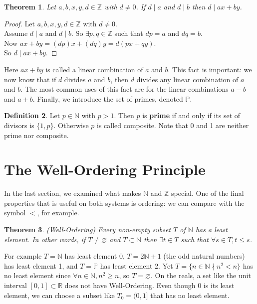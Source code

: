 \documentclass[11pt]{amsart}
\newtheorem{theorem}{Theorem}[section]
\theoremstyle{definition}
\newtheorem{definition}[theorem]{Definition}
\newcommand{\reals}{\mathbb{R}}
\newcommand{\integers}{\mathbb{Z}}
\newcommand{\naturals}{\mathbb{N}}
\newcommand{\primes}{\mathbb{P}}
\let\emptyset\varnothing
\begin{document}
\begin{theorem}
	Let $a, b, x, y, d \in \integers$ with $d \neq 0$. If $d \mid a$ and $d \mid b$ then $d \mid ax + by$.
\end{theorem}
\begin{proof}
	Let $a, b, x, y, d \in \integers$ with $d \neq 0$. \\
	Assume $d \mid a$ and $d \mid b$. So $\exists p, q \in \integers$ such that $dp = a$ and $dq = b$. \\
	Now $ax + by = (dp)x + (dq)y = d(px + qy)$. \\
	So $d \mid ax + by$.
\end{proof}
Here $ax + by$ is called a linear combination of $a$ and $b$. This fact is important: we now know that if $d$ divides $a$ and $b$, then $d$
divides any linear combination of $a$ and $b$. The most common uses of this fact are for the linear combinations $a - b$ and $a + b$.
Finally, we introduce the set of primes, denoted $\primes$.
\begin{definition}
	Let $p \in \naturals$ with $p > 1$. Then $p$ is \textbf{prime} if and only if its set of divisors is $\{ 1, p \}$. Otherwise $p$ is called composite.
	Note that 0 and 1 are neither prime nor composite.
\end{definition}

\newpage
\section{The Well-Ordering Principle}
In the last section, we examined what makes $\naturals$ and $\integers$ special. One of the final properties that is useful on both systems is
ordering: we can compare with the symbol $<$, for example.
\begin{theorem}(Well-Ordering)
	Every non-empty subset $T$ of $\naturals$ has a least element. In other words, if $T \neq \emptyset$ and $T \subset \naturals$ then
	$\exists t \in T$ such that $\forall s \in T, t \leq s$.
\end{theorem}
For example $T = \naturals$ has least element 0, $T = 2\naturals + 1$ (the odd natural numbers) has least element 1, and $T = \primes$ has
least element $2$. Yet $T = \{ n \in \naturals \nmid n^2 < n \}$ has no least element since $\forall n \in \naturals, n^2 \geq n$, so $T = \emptyset$.
On the reals, a set like the unit interval $[ 0, 1 ] \subset \reals$ does not have Well-Ordering. Even though 0 is its least element, we can choose
a subset like $T_0 = ( 0, 1 ]$ that has no least element.
\end{document}
